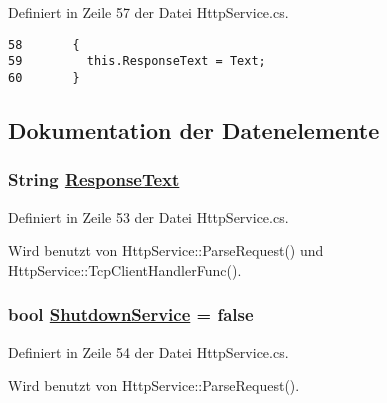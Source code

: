 Definiert in Zeile 57 der Datei Http\-Service.cs.



\footnotesize\begin{verbatim}58       {
59         this.ResponseText = Text;
60       }
\end{verbatim}\normalsize 


\subsection{Dokumentation der Datenelemente}
\hypertarget{classQbeSAS_1_1HttpService_1_1ServiceHttpResponse_QbeSAS_1_1HttpService_1_1ServiceHttpResponseo0}{
\subsubsection[ResponseText]{\setlength{\rightskip}{0pt plus 5cm}String \hyperlink{classQbeSAS_1_1HttpService_1_1ServiceHttpResponse_QbeSAS_1_1HttpService_1_1ServiceHttpResponseo0}{Response\-Text}}}
\label{classQbeSAS_1_1HttpService_1_1ServiceHttpResponse_QbeSAS_1_1HttpService_1_1ServiceHttpResponseo0}




Definiert in Zeile 53 der Datei Http\-Service.cs.

Wird benutzt von Http\-Service::Parse\-Request() und Http\-Service::Tcp\-Client\-Handler\-Func().\hypertarget{classQbeSAS_1_1HttpService_1_1ServiceHttpResponse_QbeSAS_1_1HttpService_1_1ServiceHttpResponseo1}{
\subsubsection[ShutdownService]{\setlength{\rightskip}{0pt plus 5cm}bool \hyperlink{classQbeSAS_1_1HttpService_1_1ServiceHttpResponse_QbeSAS_1_1HttpService_1_1ServiceHttpResponseo1}{Shutdown\-Service} = false}}
\label{classQbeSAS_1_1HttpService_1_1ServiceHttpResponse_QbeSAS_1_1HttpService_1_1ServiceHttpResponseo1}




Definiert in Zeile 54 der Datei Http\-Service.cs.

Wird benutzt von Http\-Service::Parse\-Request().